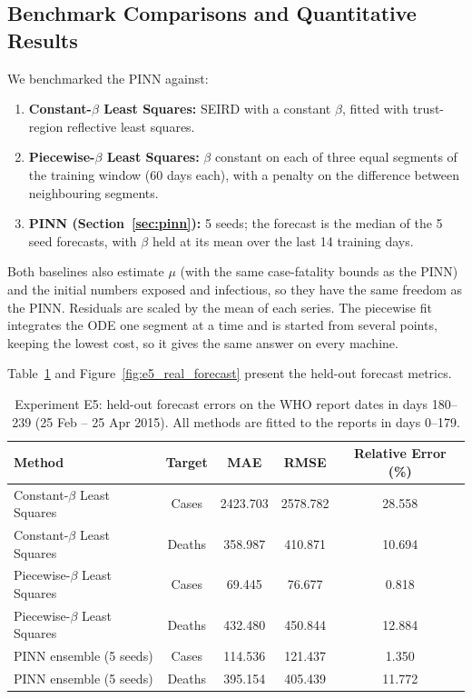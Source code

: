 \documentclass[11pt,a4paper]{article}
\begin{document}
\subsection{Benchmark Comparisons and Quantitative Results}
We benchmarked the PINN against:
\begin{enumerate}
    \item \textbf{Constant-$\beta$ Least Squares:} SEIRD with a constant $\beta$, fitted with trust-region reflective least squares.
    \item \textbf{Piecewise-$\beta$ Least Squares:} $\beta$ constant on each of three equal segments of the training window (60 days each), with a penalty on the difference between neighbouring segments.
    \item \textbf{PINN (Section~\ref{sec:pinn}):} 5 seeds; the forecast is the median of the 5 seed forecasts, with $\beta$ held at its mean over the last 14 training days.
\end{enumerate}
Both baselines also estimate $\mu$ (with the same case-fatality bounds as the PINN) and the initial numbers exposed and infectious, so they have the same freedom as the PINN. Residuals are scaled by the mean of each series. The piecewise fit integrates the ODE one segment at a time and is started from several points, keeping the lowest cost, so it gives the same answer on every machine.

Table~\ref{tab:e5_metrics} and Figure~\ref{fig:e5_real_forecast} present the held-out forecast metrics.

\begin{table}[htbp]
\centering
\caption{Experiment E5: held-out forecast errors on the WHO report dates in days 180--239 (25 Feb -- 25 Apr 2015). All methods are fitted to the reports in days 0--179.}
\label{tab:e5_metrics}
\begin{tabular}{lcccc}
\toprule
Method & Target & MAE & RMSE & Relative Error (\%) \\
\midrule
Constant-$\beta$ Least Squares & Cases & 2423.703 & 2578.782 & 28.558 \\
Constant-$\beta$ Least Squares & Deaths & 358.987 & 410.871 & 10.694 \\
\midrule
Piecewise-$\beta$ Least Squares & Cases & 69.445 & 76.677 & 0.818 \\
Piecewise-$\beta$ Least Squares & Deaths & 432.480 & 450.844 & 12.884 \\
\midrule
PINN ensemble (5 seeds) & Cases & 114.536 & 121.437 & 1.350 \\
PINN ensemble (5 seeds) & Deaths & 395.154 & 405.439 & 11.772 \\
\bottomrule
\end{tabular}
\end{table}
\end{document}

